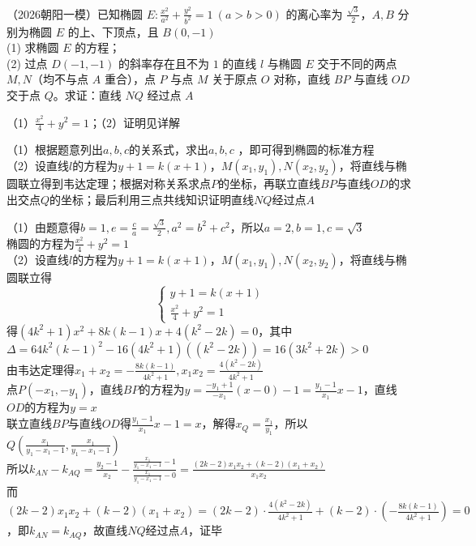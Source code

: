 \begin{example}

（2026朝阳一模）已知椭圆 $E:\frac{x^2}{a^2}+\frac{y^2}{b^2}=1\ (a>b>0)$ 的离心率为 $\frac{\sqrt{3}}{2}$，$A,B$ 分别为椭圆 $E$ 的上、下顶点，且 $B(0,-1)$\\
(1) 求椭圆 $E$ 的方程；\\
(2) 过点 $D(-1,-1)$ 的斜率存在且不为 $1$ 的直线 $l$ 与椭圆 $E$ 交于不同的两点 $M,N$（均不与点 $A$ 重合），点 $P$ 与点 $M$ 关于原点 $O$ 对称，直线 $BP$ 与直线 $OD$ 交于点 $Q$。求证：直线 $NQ$ 经过点 $A$
\end{example}

\begin{corollary*}
    （1）$\frac{x^2}{4}+y^2=1$；（2）证明见详解
\end{corollary*}
\begin{property}
（1）根据题意列出$a, b, c$的关系式，求出$a, b, c$ ，即可得到椭圆的标准方程 \\
（2）设直线$l$的方程为$y+1 = k(x+1)$，$M(x_1, y_1), N(x_2, y_2)$，将直线与椭圆联立得到韦达定理；根据对称关系求点$P$的坐标，再联立直线$BP$与直线$OD$的求出交点$Q$的坐标；最后利用三点共线知识证明直线$NQ$经过点$A$
\end{property}
\begin{solution}
（1）由题意得$b = 1, e = \frac{c}{a} = \frac{\sqrt{3}}{2} , a^2 = b^2 + c^2$，所以$a = 2, b = 1, c = \sqrt{3}$\\
椭圆的方程为$\frac{x^2}{4}+y^2=1$\\
（2）设直线$l$的方程为$y+1 = k(x+1)$，$M(x_1, y_1), N(x_2, y_2)$，将直线与椭圆联立得
\[\begin{cases}
y+1 = k(x+1) \\
\frac{x^2}{4}+y^2=1
\end{cases}\]
得$(4k^2 + 1)x^2 + 8k(k - 1)x + 4(k^2 -2k) = 0$，其中$\Delta = 64k^2(k-1)^2 -16(4k^2 + 1)((k^2 -2k)) = 16(3k^2 +2k) > 0$\\
由韦达定理得$x_1 + x_2 = -\frac{8k(k - 1)}{4k^2 + 1}, x_1x_2 = \frac{4(k^2 -2k)}{4k^2 + 1}$\\
点$P(-x_1, -y_1)$，直线$BP$的方程为$y  = \frac{-y_1 + 1}{-x_1}(x - 0) -1 = \frac{y_1 - 1}{x_1}x - 1$，直线$OD$的方程为$y = x$\\
联立直线$BP$与直线$OD$得$\frac{y_1 - 1}{x_1}x - 1 = x$，解得$x_Q = \frac{x_1}{y_1}$，所以$Q\left(\frac{x_1}{y_1 - x_1 - 1}, \frac{x_1}{y_1 - x_1 - 1}\right)$\\
所以$k_{AN}  - k_{AQ}= \frac{y_2 -1}{x_2} - \frac{\frac{x_1}{y_1 -x_1 - 1} - 1}{\frac{x_1}{y_1 -x_1 - 1} - 0} = \frac{(2k-2)x_1x_2 + (k-2)(x_1 + x_2)}{x_1x_2}$\\
而$(2k-2)x_1x_2 + (k-2)(x_1 + x_2) = (2k-2) \cdot \frac{4(k^2 -2k)}{4k^2 + 1} + (k-2) \cdot \left(-\frac{8k(k - 1)}{4k^2 + 1}\right) = 0$，即$k_{AN} = k_{AQ}$，故直线$NQ$经过点$A$，证毕

\end{solution}



